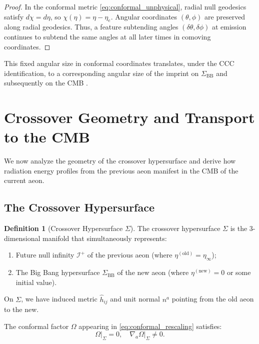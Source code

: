 \documentclass[11pt,a4paper]{article}
\theoremstyle{plain}
\theoremstyle{definition}
\newtheorem{definition}[theorem]{Definition}
\theoremstyle{remark}
\newcommand{\scriplus}{\mathcal{I}^+}
\newcommand{\sigmabb}{\Sigma_{\mathrm{BB}}}
\begin{document}
\begin{proof}
In the conformal metric \eqref{eq:conformal_unphysical}, radial null geodesics satisfy $d\chi = d\eta$, so $\chi(\eta) = \eta - \eta_e$. Angular coordinates $(\theta, \phi)$ are preserved along radial geodesics. Thus, a feature subtending angles $(\delta\theta, \delta\phi)$ at emission continues to subtend the same angles at all later times in comoving coordinates.
\end{proof}

This fixed angular size in conformal coordinates translates, under the CCC identification, to a corresponding angular size of the imprint on $\sigmabb$ and subsequently on the CMB \cite{ccc_wiki,penrose_cycles}.

\section{Crossover Geometry and Transport to the CMB}\label{sec:crossover}

We now analyze the geometry of the crossover hypersurface and derive how radiation energy profiles from the previous aeon manifest in the CMB of the current aeon.

\subsection{The Crossover Hypersurface}

\begin{definition}[Crossover Hypersurface $\Sigma$]\label{def:crossover}
The crossover hypersurface $\Sigma$ is the 3-dimensional manifold that simultaneously represents:
\begin{enumerate}
    \item Future null infinity $\scriplus$ of the previous aeon (where $\eta^{(\text{old})} = \eta_\infty$);
    \item The Big Bang hypersurface $\sigmabb$ of the new aeon (where $\eta^{(\text{new})} = 0$ or some initial value).
\end{enumerate}
On $\Sigma$, we have induced metric $\hat{h}_{ij}$ and unit normal $n^a$ pointing from the old aeon to the new.
\end{definition}

The conformal factor $\Omega$ appearing in \eqref{eq:conformal_rescaling} satisfies:
\begin{equation}\label{eq:omega_boundary}
    \Omega\big|_\Sigma = 0, \quad \nabla_a \Omega\big|_\Sigma \neq 0.
\end{equation}
\end{document}
